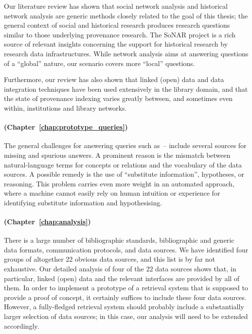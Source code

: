 Our literature review has shown that
social network analysis and historical network analysis are generic methods closely related to the goal of this thesis;
the general context of social and historical research produces research questions similar to
those underlying provenance research.
The SoNAR project is a rich source of relevant insights concerning the support for historical research
by research data infrastructures.
While network analysis aims at answering questions of a \enquote{global} nature,
our scenario covers more \enquote{local} questions.

Furthermore, our review has also shown that
linked (open) data and data integration techniques have been used extensively in the library domain,
and that the state of provenance indexing varies greatly between, and sometimes even within,
institutions and library networks.

\paragraph{\RQ[2] (Chapter~\ref{chap:prototype_queries})}

The general challenges for answering queries such as~--
include several sources for missing and spurious answers.
A prominent reason is the mismatch between natural-language terms for concepts or relations
and the vocabulary of the data sources.
A possible remedy is the use of \enquote{substitute information}, hypotheses, or reasoning.
This problem carries even more weight in an automated approach, where
a machine cannot easily rely on human intuition or experience for identifying substitute information
and hypothesising.

\paragraph{\RQ[3] (Chapter~\ref{chap:analysis})}

There is a large number of bibliographic standards, bibliographic and generic data formats,
communication protocols, and data sources. We have identified four groups of altogether 22
obvious data sources, and this list is by far not exhaustive. Our detailed analysis of four
of the 22 data sources shows that, in particular, linked (open) data and the relevant
interfaces are provided by all of them. 
In order to implement a prototype of a retrieval system that is supposed to provide a proof of concept,
it certainly suffices to include these four data sources.
However, a fully-fledged retrieval system should probably include a substantially larger selection of data sources;
in this case, our analysis will need to be extended accordingly.

